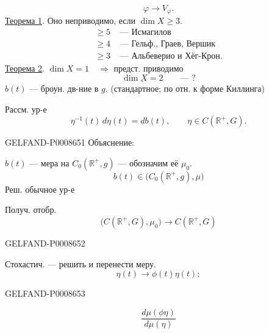 \[
\varphi\longrightarrow V_\varphi.
\]
\uline{Теорема 1}. Оно неприводимо, если \(\dim X\geq 3\).
\[
\begin{aligned}
\geq5&\text{ — Исмагилов}\\
\geq4&\text{ — Гельф., Граев, Вершик}\\
\geq3&\text{ — Альбеверио и Хёг-Крон.}
\end{aligned}
\]
\uline{Теорема 2}. \(\dim X=1\quad\Rightarrow\) предст. приводимо
\[
\underline{\dim X=2}\qquad\text{— ?}
\]
\(b(t)\) — броун. дв-ние в \(g\). (стандартное; по отн. к форме Киллинга)

Рассм. ур-е
\[
\eta^{-1}(t)\,d\eta(t)=db(t),\qquad
\eta\in C(\mathbb R^+,G).\tag{3}
\]


\begin{GelfandAdjacentEvidence}{GELFAND-P000865}{1}
Объяснение:

\(b(t)\) — мера на \(C_0(\mathbb R^+,g)\) — обозначим её \(\mu_0\).
\[
b(t)\in\bigl(C_0(\mathbb R^+,g),\mu\bigr)
\]
Реш. обычное ур-е
 
Получ. отобр.
\[
\bigl(C(\mathbb R^+,G),\mu_0\bigr)\longrightarrow C(\mathbb R^+,G)
\]
\end{GelfandAdjacentEvidence}
\begin{GelfandAdjacentEvidence}{GELFAND-P000865}{2}


Стохастич. — решить и перенести меру.
\[
\eta(t)\longrightarrow\phi(t)\eta(t);
\]
\end{GelfandAdjacentEvidence}
\begin{GelfandAdjacentEvidence}{GELFAND-P000865}{3}

\[
\frac{d\mu(\phi\eta)}{d\mu(\eta)}
\]
\end{GelfandAdjacentEvidence}
